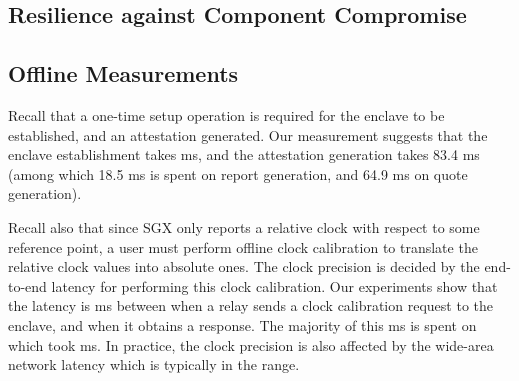 \subsection{Resilience against Component Compromise}


\subsection{Offline Measurements}



Recall that a one-time setup operation is required 
for the enclave to be established, and an attestation generated. 
Our measurement suggests that the enclave establishment takes
 ms, 
and the attestation generation takes 
83.4 ms (among which 
18.5 ms is spent 
on report generation, 
and 64.9 ms on quote generation).

Recall also that since SGX only reports a relative clock
with respect to some reference point,  
a user must perform offline clock calibration 
to translate the  relative clock values into absolute ones.
The clock precision is decided
by the end-to-end latency for performing 
this clock calibration. 
Our experiments show that the latency is  ms 
between when a relay sends a clock calibration request
to the enclave, and when it obtains a response.
The majority of this  ms is spent on
which took  ms.
In practice, the clock precision is also affected
by the wide-area network latency
which is typically in the  range.

